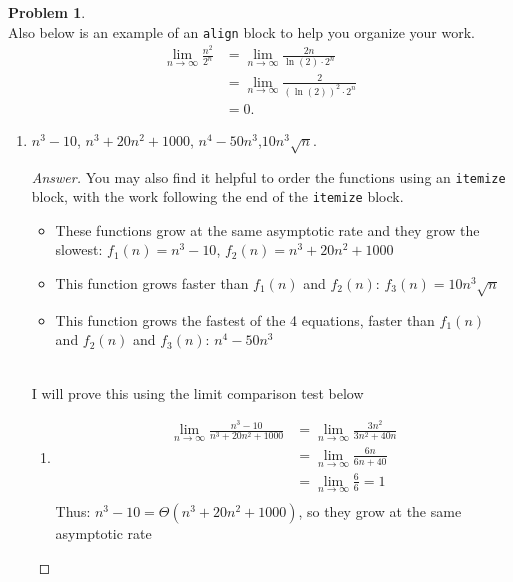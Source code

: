 \documentclass[11pt]{article}
\theoremstyle{definition}
\theoremstyle{definition}
\newtheorem{required}{Problem}
\theoremstyle{definition}
\begin{document}
\begin{required}
\noindent \\ Also below is an example of an \texttt{align} block to help you organize your work.
\begin{align*}
\lim_{n \to \infty} \frac{n^{2}}{2^{n}} &= \lim_{n \to \infty} \frac{2n}{\ln(2) \cdot 2^{n}} \\
&= \lim_{n \to \infty} \frac{2}{(\ln(2))^{2} \cdot 2^{n}} \\
&= 0.
\end{align*}
\newpage
\begin{enumerate} [label=(\alph*)]
\subsection{Problem 2\ref{1a}}
    \item \label{1a} $ n^3-10$, \qquad  $ n^3+20n^2+1000$, \qquad $n^4-50n^3$,\qquad  $10n^3\sqrt{n}$.
    \begin{proof}[Answer]
\noindent You may also find it helpful to order the functions using an \texttt{itemize} block, with the work following the end of the \texttt{itemize} block.
\begin{itemize}
\item These functions grow at the same asymptotic rate and they grow the slowest: $f_{1}(n)= n^3-10$, $f_{2}(n)= n^3+20n^2+1000$
\item This function grows faster than $f_{1}(n)$ and $f_{2}(n)$:  $f_{3}(n)= 10n^3\sqrt{n}$
\item This function grows the fastest of the 4 equations, faster than $f_{1}(n)$ and $f_{2}(n)$ and $f_{3}(n)$: $n^4-50n^3$
\end{itemize}


\noindent \\ I will prove this using the limit comparison test below
\begin{enumerate}

\item
\begin{align*}
\lim_{n \to \infty} \frac{n^3-10}{ n^3+20n^2+1000} &= \lim_{n \to \infty} \frac{3n^2}{3n^2+40n} \\
&= \lim_{n \to \infty} \frac{6n}{6n+40} \\
&= \lim_{n \to \infty} \frac{6}{6} = 1 \\
\end{align*}
Thus: $n^3-10 = \Theta(n^3+20n^2+1000)$, so they grow at the same asymptotic rate


\end{enumerate}
\end{proof}
\end{enumerate}
\end{required}
\end{document}
